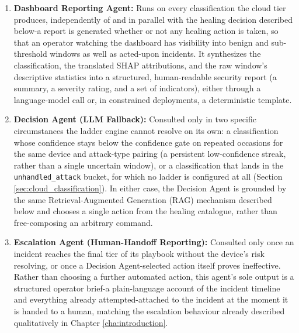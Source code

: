 \begin{enumerate}
	\item \textbf{Dashboard Reporting Agent:} Runs on every classification the cloud tier produces, independently of and in parallel with the healing decision described below-a report is generated whether or not any healing action is taken, so that an operator watching the dashboard has visibility into benign and sub-threshold windows as well as acted-upon incidents. It synthesizes the classification, the translated SHAP attributions, and the raw window's descriptive statistics into a structured, human-readable security report (a summary, a severity rating, and a set of indicators), either through a language-model call or, in constrained deployments, a deterministic template.
	\item \textbf{Decision Agent (LLM Fallback):} Consulted only in two specific circumstances the ladder engine cannot resolve on its own: a classification whose confidence stays below the confidence gate on repeated occasions for the same device and attack-type pairing (a persistent low-confidence streak, rather than a single uncertain window), or a classification that lands in the \texttt{unhandled\_attack} bucket, for which no ladder is configured at all (Section \ref{sec:cloud_classification}). In either case, the Decision Agent is grounded by the same Retrieval-Augmented Generation (RAG) mechanism described below and chooses a single action from the healing catalogue, rather than free-composing an arbitrary command.
	\item \textbf{Escalation Agent (Human-Handoff Reporting):} Consulted only once an incident reaches the final tier of its playbook without the device's risk resolving, or once a Decision Agent-selected action itself proves ineffective. Rather than choosing a further automated action, this agent's sole output is a structured operator brief-a plain-language account of the incident timeline and everything already attempted-attached to the incident at the moment it is handed to a human, matching the escalation behaviour already described qualitatively in Chapter \ref{cha:introduction}.
\end{enumerate}

